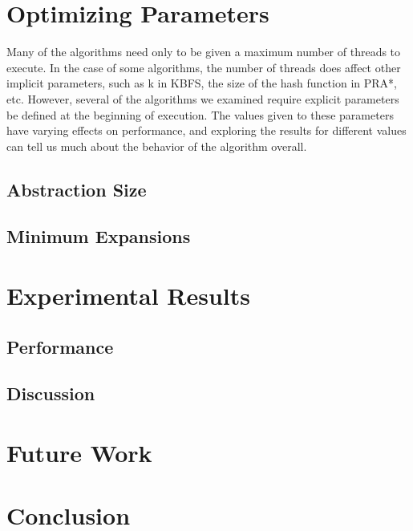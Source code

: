 \documentclass{article}
\begin{document}
\section{Optimizing Parameters}
Many of the algorithms need only to be given a maximum number of threads to execute. In the case of some algorithms, the number of threads does affect other implicit parameters, such as k in KBFS, the size of the hash function in PRA*, etc. However, several of the algorithms we examined require explicit parameters be defined at the beginning of execution. The values given to these parameters have varying effects on performance, and exploring the results for different values can tell us much about the behavior of the algorithm overall.
\subsection{Abstraction Size}
\subsection{Minimum Expansions}
\section{Experimental Results}
\subsection{Performance}
\subsection{Discussion}
\section{Future Work}
\section{Conclusion}



\end{document}
